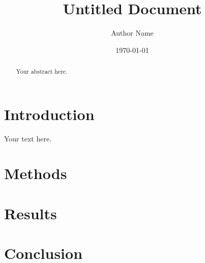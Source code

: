 \documentclass[12pt]{article}
\title{Untitled Document}
\author{Author Name}
\date{\today}
\begin{document}
\maketitle

\begin{abstract}
Your abstract here.
\end{abstract}

\section{Introduction}

Your text here.

\section{Methods}

\section{Results}

\section{Conclusion}



\end{document}
